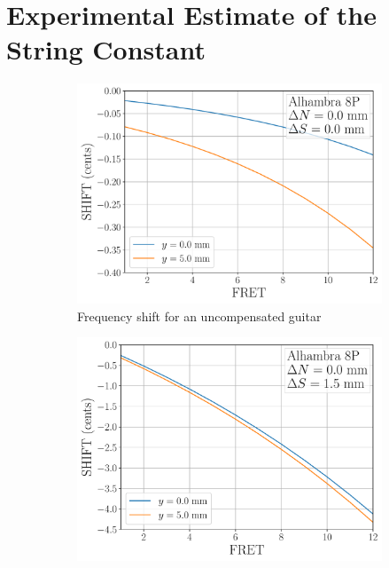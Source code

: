 %
%
%

 \section{Experimental Estimate of the String Constant\label{sct:exp}}

 \begin{figure}
  \centering
  \begin{subfigure}[b]{0.8\textwidth}
   \centering
   \includegraphics[width=5.0in]{figures/norm_error_uncompensated}
   \caption{Frequency shift for an uncompensated guitar}
   \label{fig:norm_error_uncompensated}
  \end{subfigure}
  \par\vspace{0.25in}
  \begin{subfigure}[b]{0.8\textwidth}
   \centering
   \includegraphics[width=5.0in]{figures/norm_error_factory}

\end{subfigure}
\end{figure}
